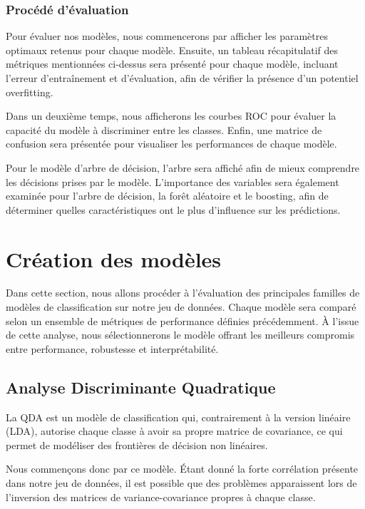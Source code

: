\documentclass[a4paper,11pt]{article}
\begin{document}
\subsubsection{Procédé d'évaluation}

Pour évaluer nos modèles, nous commencerons par afficher les paramètres optimaux retenus pour chaque modèle. Ensuite, un tableau récapitulatif des métriques mentionnées ci-dessus sera présenté pour chaque modèle, incluant l'erreur d'entraînement et d'évaluation, afin de vérifier la présence d'un potentiel overfitting.

Dans un deuxième temps, nous afficherons les courbes ROC pour évaluer la capacité du modèle à discriminer entre les classes. Enfin, une matrice de confusion sera présentée pour visualiser les performances de chaque modèle.

Pour le modèle d'arbre de décision, l'arbre sera affiché afin de mieux comprendre les décisions prises par le modèle. L'importance des variables sera également examinée pour l'arbre de décision, la forêt aléatoire et le boosting, afin de déterminer quelles caractéristiques ont le plus d'influence sur les prédictions.


\section{Création des modèles}

Dans cette section, nous allons procéder à l’évaluation des principales familles de modèles de classification sur notre jeu de données. Chaque modèle sera comparé selon un ensemble de métriques de performance définies précédemment. À l’issue de cette analyse, nous sélectionnerons le modèle offrant les meilleurs compromis entre performance, robustesse et interprétabilité.

\subsection{Analyse Discriminante Quadratique}

La QDA est un modèle de classification qui, contrairement à la version linéaire (LDA), autorise chaque classe à avoir sa propre matrice de covariance, ce qui permet de modéliser des frontières de décision non linéaires.

Nous commençons donc par ce modèle. Étant donné la forte corrélation présente dans notre jeu de données, il est possible que des problèmes apparaissent lors de l’inversion des matrices de variance-covariance propres à chaque classe. 
\end{document}
